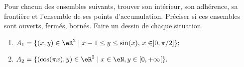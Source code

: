 \begin{exercice}\label{exoGeomAnal-0015}


Pour chacun des ensembles suivants, trouver son intérieur, son adhérence, sa frontière et l'ensemble de ses points d'accumulation. Préciser si ces ensembles sont ouverts, fermés, bornés. Faire un dessin de chaque situation.

	\begin{enumerate}
		\item	
 $A_1 = \{ (x, y ) \in \eR^2 \; | \; x-1\leq y \leq \sin(x),\, x\in ]0, \pi/2 ] \} ;$
               
                \item
$A_2 = \{ (\cos(\pi x), y ) \in \eR^2 \; | \; x \in \eN , y \in [0,+\infty[ \}. $
	\end{enumerate}

\end{exercice}
